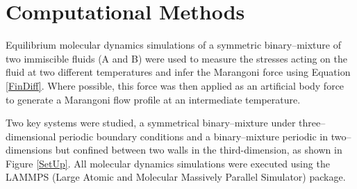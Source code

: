 \section{Computational Methods}

Equilibrium molecular dynamics simulations of a symmetric binary--mixture of two immiscible fluids (A and B) were used to measure the stresses acting on the fluid at two different temperatures and infer the Marangoni force using Equation \ref{FinDiff}.
Where possible, this force was then applied as an artificial body force to generate a Marangoni flow profile at an intermediate temperature.

Two key systems were studied, a symmetrical binary–mixture under three--dimensional periodic boundary conditions and a binary--mixture periodic in two--dimensions but confined between two walls in the third-dimension, as shown in Figure \ref{SetUp}.
All molecular dynamics simulations were executed using the LAMMPS (Large Atomic and Molecular Massively Parallel Simulator) package.\cite{LAMMPS}  

